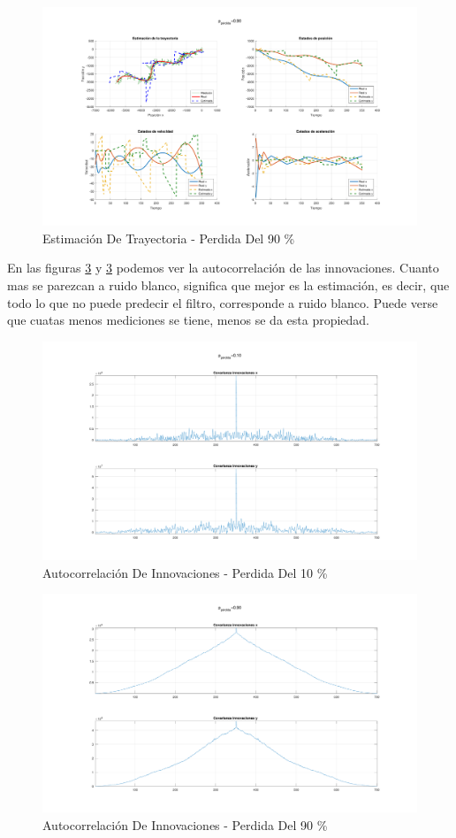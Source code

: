	\begin{figure}[H]
		\centering
		\includegraphics[width=1.0\textwidth,keepaspectratio]{Figuras/graf_ej7_2.pdf}
		\caption{Estimación De Trayectoria - Perdida Del 90 \%}
		\label{fig:ej7_2}
	\end{figure}
	
	En las figuras \ref{fig:ej7_1_inov} y \ref{fig:ej7_1_inov} podemos ver la autocorrelación de las innovaciones. Cuanto mas se parezcan a ruido blanco, significa que mejor es la estimación, es decir, que todo lo que no puede predecir el filtro, corresponde a ruido blanco. Puede verse que cuatas menos mediciones se tiene, menos se da esta propiedad.
	
	\begin{figure}[H]
		\centering
		\includegraphics[width=1.0\textwidth,keepaspectratio]{Figuras/covinn_ej7_1.pdf}
		\caption{Autocorrelación De Innovaciones - Perdida Del 10 \%}
		\label{fig:ej7_1_inov}
	\end{figure}
	
	\begin{figure}[H]
		\centering
		\includegraphics[width=1.0\textwidth,keepaspectratio]{Figuras/covinn_ej7_2.pdf}
		\caption{Autocorrelación De Innovaciones - Perdida Del 90 \%}
		\label{fig:ej7_1_inov}
	\end{figure}
